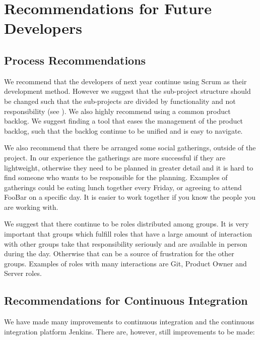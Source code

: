 \chapter{Recommendations for Future Developers}\label{chap:future_dev_recommendations}

\section{Process Recommendations}
We recommend that the developers of next year continue using Scrum as their development method. However we suggest that the sub-project structure should be changed such that the sub-projects are divided by functionality and not responsibility (see ). We also highly recommend using a common product backlog. We suggest finding a tool that eases the management of the product backlog, such that the backlog continue to be unified and is easy to navigate.

We also recommend that there be arranged some social gatherings, outside of the project. In our experience the gatherings are more successful if they are lightweight, otherwise they need to be planned in greater detail and it is hard to find someone who wants to be responsible for the planning. Examples of gatherings could be eating lunch together every Friday, or agreeing to attend FooBar on a specific day. It is easier to work together if you know the people you are working with.

We suggest that there continue to be roles distributed among groups. It is very important that groups which fulfill roles that have a large amount of interaction with other groups take that responsibility seriously and are available in person during the day. Otherwise that can be a source of frustration for the other groups. Examples of roles with many interactions are Git, Product Owner and Server roles.

\section{Recommendations for Continuous Integration}
We have made many improvements to continuous integration and the continuous integration platform Jenkins. There are, however, still improvements to be made: 

